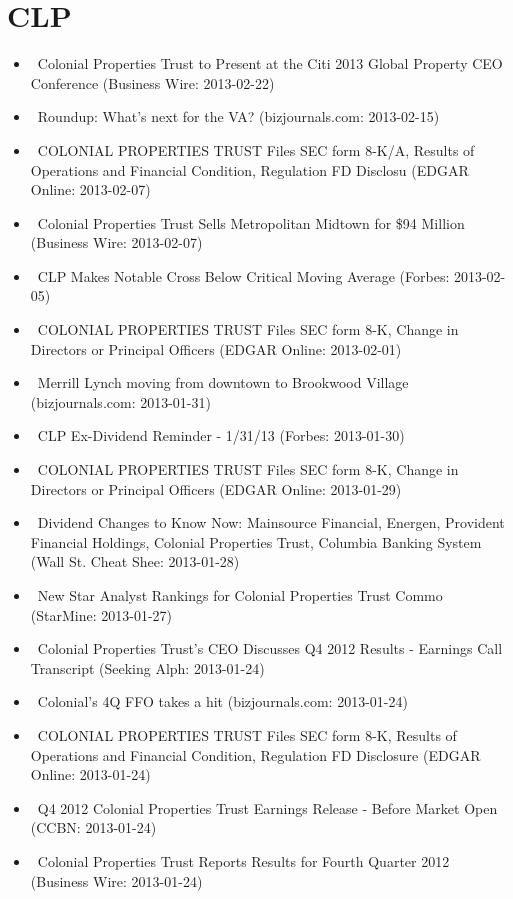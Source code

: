\documentclass[11pt,asymmetric]{article}
\begin{document}
\section*{CLP}
\begin{itemize}
\item\ Colonial Properties Trust to Present at the Citi 2013 Global Property CEO Conference (Business Wire: 2013-02-22)
\item\ Roundup: What's next for the VA? (bizjournals.com: 2013-02-15)
\item\ COLONIAL PROPERTIES TRUST Files SEC form 8-K/A, Results of Operations and Financial Condition, Regulation FD Disclosu (EDGAR Online: 2013-02-07)
\item\ Colonial Properties Trust Sells Metropolitan Midtown for \$94 Million (Business Wire: 2013-02-07)
\item\ CLP Makes Notable Cross Below Critical Moving Average (Forbes: 2013-02-05)
\item\ COLONIAL PROPERTIES TRUST Files SEC form 8-K, Change in Directors or Principal Officers (EDGAR Online: 2013-02-01)
\item\ Merrill Lynch moving from downtown to Brookwood Village (bizjournals.com: 2013-01-31)
\item\ CLP Ex-Dividend Reminder - 1/31/13 (Forbes: 2013-01-30)
\item\ COLONIAL PROPERTIES TRUST Files SEC form 8-K, Change in Directors or Principal Officers (EDGAR Online: 2013-01-29)
\item\ Dividend Changes to Know Now: Mainsource Financial, Energen, Provident Financial Holdings, Colonial Properties Trust, Columbia Banking System (Wall St. Cheat Shee: 2013-01-28)
\item\ New Star Analyst Rankings for Colonial Properties Trust Commo (StarMine: 2013-01-27)
\item\ Colonial Properties Trust's CEO Discusses Q4 2012 Results - Earnings Call Transcript (Seeking Alph: 2013-01-24)
\item\ Colonial's 4Q FFO takes a hit (bizjournals.com: 2013-01-24)
\item\ COLONIAL PROPERTIES TRUST Files SEC form 8-K, Results of Operations and Financial Condition, Regulation FD Disclosure (EDGAR Online: 2013-01-24)
\item\ Q4 2012 Colonial Properties Trust Earnings Release - Before Market Open (CCBN: 2013-01-24)
\item\ Colonial Properties Trust Reports Results for Fourth Quarter 2012 (Business Wire: 2013-01-24)

\end{itemize}
\end{document}
